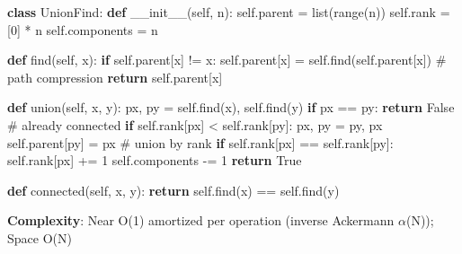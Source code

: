 \documentclass[11pt]{article}
\newenvironment{Shaded}{\begin{snugshade}}{\end{snugshade}}
\newcommand{\BuiltInTok}[1]{\textcolor[rgb]{0.50,0.55,0.55}{#1}}
\newcommand{\CommentTok}[1]{\textcolor[rgb]{0.48,0.49,0.49}{#1}}
\newcommand{\ControlFlowTok}[1]{\textcolor[rgb]{0.99,0.74,0.29}{\textbf{#1}}}
\newcommand{\DecValTok}[1]{\textcolor[rgb]{0.96,0.45,0.00}{#1}}
\newcommand{\FunctionTok}[1]{\textcolor[rgb]{0.56,0.27,0.68}{#1}}
\newcommand{\KeywordTok}[1]{\textcolor[rgb]{0.81,0.81,0.76}{\textbf{#1}}}
\newcommand{\NormalTok}[1]{\textcolor[rgb]{0.81,0.81,0.76}{#1}}
\newcommand{\OperatorTok}[1]{\textcolor[rgb]{0.81,0.81,0.76}{#1}}
\newcommand{\VariableTok}[1]{\textcolor[rgb]{0.15,0.68,0.68}{#1}}
\begin{document}
\begin{Shaded}
\begin{Highlighting}[]
\KeywordTok{class}\NormalTok{ UnionFind:}
    \KeywordTok{def} \FunctionTok{\_\_init\_\_}\NormalTok{(}\VariableTok{self}\NormalTok{, n):}
        \VariableTok{self}\NormalTok{.parent }\OperatorTok{=} \BuiltInTok{list}\NormalTok{(}\BuiltInTok{range}\NormalTok{(n))}
        \VariableTok{self}\NormalTok{.rank }\OperatorTok{=}\NormalTok{ [}\DecValTok{0}\NormalTok{] }\OperatorTok{*}\NormalTok{ n}
        \VariableTok{self}\NormalTok{.components }\OperatorTok{=}\NormalTok{ n}

    \KeywordTok{def}\NormalTok{ find(}\VariableTok{self}\NormalTok{, x):}
        \ControlFlowTok{if} \VariableTok{self}\NormalTok{.parent[x] }\OperatorTok{!=}\NormalTok{ x:}
            \VariableTok{self}\NormalTok{.parent[x] }\OperatorTok{=} \VariableTok{self}\NormalTok{.find(}\VariableTok{self}\NormalTok{.parent[x])   }\CommentTok{\# path compression}
        \ControlFlowTok{return} \VariableTok{self}\NormalTok{.parent[x]}

    \KeywordTok{def}\NormalTok{ union(}\VariableTok{self}\NormalTok{, x, y):}
\NormalTok{        px, py }\OperatorTok{=} \VariableTok{self}\NormalTok{.find(x), }\VariableTok{self}\NormalTok{.find(y)}
        \ControlFlowTok{if}\NormalTok{ px }\OperatorTok{==}\NormalTok{ py:}
            \ControlFlowTok{return} \VariableTok{False}                                  \CommentTok{\# already connected}
        \ControlFlowTok{if} \VariableTok{self}\NormalTok{.rank[px] }\OperatorTok{\textless{}} \VariableTok{self}\NormalTok{.rank[py]:}
\NormalTok{            px, py }\OperatorTok{=}\NormalTok{ py, px}
        \VariableTok{self}\NormalTok{.parent[py] }\OperatorTok{=}\NormalTok{ px                             }\CommentTok{\# union by rank}
        \ControlFlowTok{if} \VariableTok{self}\NormalTok{.rank[px] }\OperatorTok{==} \VariableTok{self}\NormalTok{.rank[py]:}
            \VariableTok{self}\NormalTok{.rank[px] }\OperatorTok{+=} \DecValTok{1}
        \VariableTok{self}\NormalTok{.components }\OperatorTok{{-}=} \DecValTok{1}
        \ControlFlowTok{return} \VariableTok{True}

    \KeywordTok{def}\NormalTok{ connected(}\VariableTok{self}\NormalTok{, x, y):}
        \ControlFlowTok{return} \VariableTok{self}\NormalTok{.find(x) }\OperatorTok{==} \VariableTok{self}\NormalTok{.find(y)}
\end{Highlighting}
\end{Shaded}

\textbf{Complexity}: Near O(1) amortized per operation (inverse Ackermann \(\alpha\)(N)); Space O(N)
\end{document}
